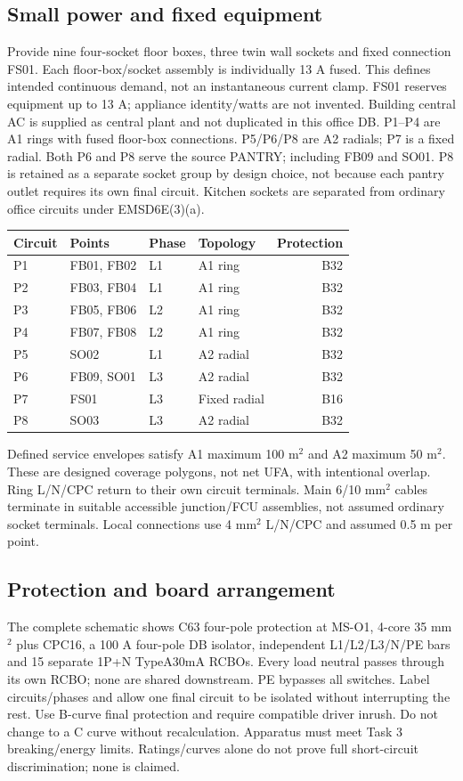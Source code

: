 \documentclass[11pt]{article}
\begin{document}
\subsection*{Small power and fixed equipment}
Provide nine four-socket floor boxes, three twin wall sockets and fixed connection FS01. Each floor-box/socket assembly is individually 13 A fused. This defines intended continuous demand, not an instantaneous current clamp. FS01 reserves equipment up to 13 A;  appliance identity/watts are not invented. Building central AC is supplied as central plant and not duplicated in this office DB.
P1--P4 are A1 rings with fused floor-box connections. P5/P6/P8 are A2 radials;  P7 is a fixed radial. Both P6 and P8 serve the source PANTRY;  including FB09 and SO01. P8 is retained as a separate socket group by design choice, not because each pantry outlet requires its own final circuit. Kitchen sockets are separated from ordinary office circuits under EMSD6E(3)(a).
\begin{center}\begin{tabular}{llllr}\toprule
Circuit & Points & Phase & Topology & Protection\\\midrule

P1 & FB01, FB02 & L1 & A1 ring & B32 \\
P2 & FB03, FB04 & L1 & A1 ring & B32 \\
P3 & FB05, FB06 & L2 & A1 ring & B32 \\
P4 & FB07, FB08 & L2 & A1 ring & B32 \\
P5 & SO02 & L1 & A2 radial & B32 \\
P6 & FB09, SO01 & L3 & A2 radial & B32 \\
P7 & FS01 & L3 & Fixed radial & B16 \\
P8 & SO03 & L3 & A2 radial & B32 \\

\bottomrule\end{tabular}\end{center}
Defined service envelopes satisfy A1 maximum 100 m$^2$ and A2 maximum 50 m$^2$. These are designed coverage polygons, not net UFA, with intentional overlap. Ring L/N/CPC return to their own circuit terminals. Main 6/10 mm$^2$ cables terminate in suitable accessible junction/FCU assemblies, not assumed ordinary socket terminals. Local connections use 4 mm$^2$ L/N/CPC and assumed 0.5 m per point.

\subsection*{Protection and board arrangement}
The complete schematic shows C63 four-pole protection at MS-O1, 4-core 35 mm$^2$ plus CPC16, a 100 A four-pole DB isolator, independent L1/L2/L3/N/PE bars and 15 separate 1P+N TypeA30mA RCBOs. Every load neutral passes through its own RCBO;  none are shared downstream. PE bypasses all switches. Label circuits/phases and allow one final circuit to be isolated without interrupting the rest.
Use B-curve final protection and require compatible driver inrush. Do not change to a C curve without recalculation. Apparatus must meet Task 3 breaking/energy limits. Ratings/curves alone do not prove full short-circuit discrimination;  none is claimed.
\end{document}
